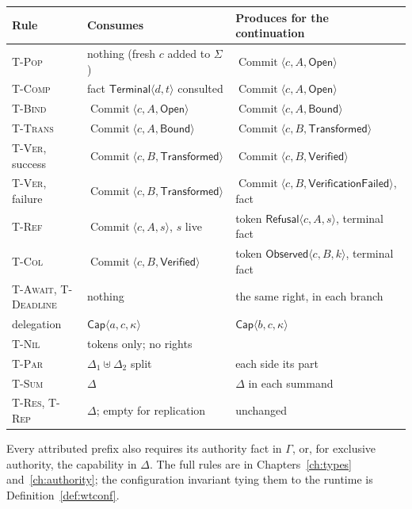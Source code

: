 \documentclass[11pt,openany]{book}
\theoremstyle{remark}
\newcommand{\Commit}{\operatorname{Commit}}
\begin{document}
\begin{center}
\small
\begin{tabular}{lll}
\toprule
Rule & Consumes & Produces for the continuation\\
\midrule
\textsc{T-Pop} & nothing (fresh $c$ added to $\Sigma$) & $\Commit\langle c,A,\mathsf{Open}\rangle$\\
\textsc{T-Comp} & fact $\mathsf{Terminal}\langle d,t\rangle$ consulted & $\Commit\langle c,A,\mathsf{Open}\rangle$\\
\textsc{T-Bind} & $\Commit\langle c,A,\mathsf{Open}\rangle$ & $\Commit\langle c,A,\mathsf{Bound}\rangle$\\
\textsc{T-Trans} & $\Commit\langle c,A,\mathsf{Bound}\rangle$ & $\Commit\langle c,B,\mathsf{Transformed}\rangle$\\
\textsc{T-Ver}, success & $\Commit\langle c,B,\mathsf{Transformed}\rangle$ & $\Commit\langle c,B,\mathsf{Verified}\rangle$\\
\textsc{T-Ver}, failure & $\Commit\langle c,B,\mathsf{Transformed}\rangle$ & $\Commit\langle c,B,\mathsf{VerificationFailed}\rangle$, fact\\
\textsc{T-Ref} & $\Commit\langle c,A,s\rangle$, $s$ live & token $\mathsf{Refusal}\langle c,A,s\rangle$, terminal fact\\
\textsc{T-Col} & $\Commit\langle c,B,\mathsf{Verified}\rangle$ & token $\mathsf{Observed}\langle c,B,k\rangle$, terminal fact\\
\textsc{T-Await}, \textsc{T-Deadline} & nothing & the same right, in each branch\\
delegation & $\mathsf{Cap}\langle a,c,\kappa\rangle$ & $\mathsf{Cap}\langle b,c,\kappa\rangle$\\
\textsc{T-Nil} & tokens only; no rights & \\
\textsc{T-Par} & $\Delta_1\uplus\Delta_2$ split & each side its part\\
\textsc{T-Sum} & $\Delta$ & $\Delta$ in each summand\\
\textsc{T-Res}, \textsc{T-Rep} & $\Delta$; empty for replication & unchanged\\
\bottomrule
\end{tabular}
\end{center}
Every attributed prefix also requires its authority fact in $\Gamma$, or,
for exclusive authority, the capability in $\Delta$. The full rules are
in Chapters~\ref{ch:types} and~\ref{ch:authority}; the configuration
invariant tying them to the runtime is Definition~\ref{def:wtconf}.
\end{document}
